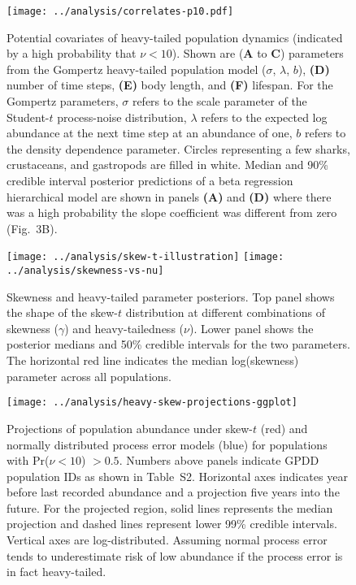 \documentclass[12pt]{article}
\begin{document}
\begin{figure}[htbp]
\begin{center}
\texttt{[image: ../analysis/correlates-p10.pdf]}

\caption{Potential covariates of heavy-tailed population dynamics (indicated by a high probability that $\nu < 10$). Shown are (\textbf{A} to \textbf{C}) parameters from the Gompertz heavy-tailed population model ($\sigma$, $\lambda$, $b$), \textbf{(D)} number of time steps, \textbf{(E)} body length, and \textbf{(F)} lifespan. For the Gompertz parameters, $\sigma$ refers to the scale parameter of the Student-$t$ process-noise distribution, $\lambda$ refers to the expected log abundance at the next time step at an abundance of one, $b$ refers to the density dependence parameter. Circles representing a few sharks, crustaceans, and gastropods are filled in white. Median and 90\% credible interval posterior predictions of a beta regression hierarchical model are shown in panels \textbf{(A)} and \textbf{(D)} where there was a high probability the slope coefficient was different from zero (Fig.~3B).}

\label{fig:correlates}
\end{center}
\end{figure}

\clearpage



\begin{figure}[htbp]
\begin{center}
\texttt{[image: ../analysis/skew-t-illustration]}
\texttt{[image: ../analysis/skewness-vs-nu]}

\caption{Skewness and heavy-tailed parameter posteriors. Top panel shows the shape of the skew-$t$ distribution at different combinations of skewness ($\gamma$) and heavy-tailedness ($\nu$). Lower panel shows the posterior medians and 50\% credible intervals for the two parameters. The horizontal red line indicates the median log(skewness) parameter across all populations.}

\label{fig:skew-nu}
\end{center}
\end{figure}

\begin{figure}[htbp]
\begin{center}
\texttt{[image: ../analysis/heavy-skew-projections-ggplot]}
\caption{Projections of population abundance under skew-$t$ (red) and
normally distributed process error models (blue) for populations with
Pr($\nu<10$) $>0.5$. Numbers above panels indicate GPDD population IDs as
shown in Table~S2. Horizontal axes indicates year before last
recorded abundance and a projection five years into the future. For the
projected region, solid lines represents the median projection and
dashed lines represent lower 99\% credible intervals. Vertical axes are
log-distributed. Assuming normal process error tends to underestimate risk of
low abundance if the process error is in fact heavy-tailed.}

\label{fig:skew-projections}
\end{center}
\end{figure}
\end{document}
